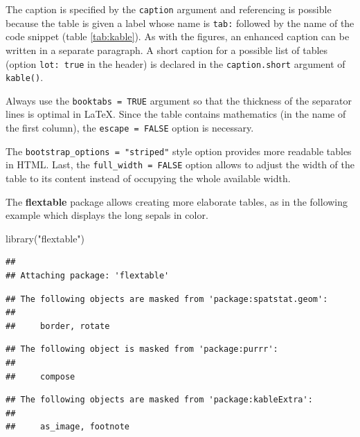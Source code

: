 \documentclass[
  12pt,
  american,
  a4paper,
  extrafontsizes,onecolumn,openright
  ]{memoir}
\newenvironment{Shaded}{\begin{snugshade}}{\end{snugshade}}
\newcommand{\FunctionTok}[1]{\textcolor[rgb]{0.00,0.00,0.00}{#1}}
\newcommand{\NormalTok}[1]{#1}
\newcommand{\StringTok}[1]{\textcolor[rgb]{0.31,0.60,0.02}{#1}}
\begin{document}
\normalsize

The caption is specified by the \texttt{caption} argument and referencing is possible because the table is given a label whose name is \texttt{tab:} followed by the name of the code snippet (table \ref{tab:kable}).
As with the figures, an enhanced caption can be written in a separate paragraph.
A short caption for a possible list of tables (option \texttt{lot:\ true} in the header) is declared in the \texttt{caption.short} argument of \texttt{kable()}.

Always use the \texttt{booktabs\ =\ TRUE} argument so that the thickness of the separator lines is optimal in LaTeX.
Since the table contains mathematics (in the name of the first column), the \texttt{escape\ =\ FALSE} option is necessary.

The \texttt{bootstrap\_options\ =\ "striped"} style option provides more readable tables in HTML.
Last, the \texttt{full\_width\ =\ FALSE} option allows to adjust the width of the table to its content instead of occupying the whole available width.

The \textbf{flextable} package allows creating more elaborate tables, as in the following example which displays the long sepals in color.

\scriptsize

\begin{Shaded}
\begin{Highlighting}[]
\FunctionTok{library}\NormalTok{(}\StringTok{"flextable"}\NormalTok{)}
\end{Highlighting}
\end{Shaded}

\begin{verbatim}
## 
## Attaching package: 'flextable'
\end{verbatim}

\begin{verbatim}
## The following objects are masked from 'package:spatstat.geom':
## 
##     border, rotate
\end{verbatim}

\begin{verbatim}
## The following object is masked from 'package:purrr':
## 
##     compose
\end{verbatim}

\begin{verbatim}
## The following objects are masked from 'package:kableExtra':
## 
##     as_image, footnote
\end{verbatim}
\end{document}
